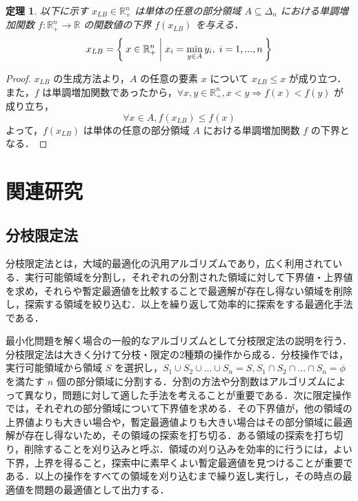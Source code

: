 \documentclass[a4paper,11pt]{jreport}
\newtheorem{theorem}{定理}
\begin{document}
\begin{theorem}\label{lower_bound_of_monotonic_function}
以下に示す $ x_{LB} \in \mathbb{R}^n_{+} $ は単体の任意の部分領域 $ A \subseteq \Delta_n $ における単調増加関数 $ f :  \mathbb{R}^n_{+} \to \mathbb{R} $ の関数値の下界 $ f(x_{LB}) $ を与える．
$$ x_{LB} = \Set{ x \in \mathbb{R}^n_{+} | x_i = \min_{y \in A } y_i, \; i = 1, ..., n } $$
\end{theorem}

\begin{proof}
$ x_{LB} $ の生成方法より，$ A $ の任意の要素 $ x $ について $ x_{LB} \leq x $ が成り立つ．\\
また，$ f $ は単調増加関数であったから，$ \forall x, y \in \mathbb{R}^n_{+}, x < y \Rightarrow f(x) < f(y) $ が成り立ち，
$$ \forall x \in A, f(x_{LB}) \leq f(x) $$
よって，$ f(x_{LB}) $ は単体の任意の部分領域 $ A $ における単調増加関数 $ f $ の下界となる．
\end{proof}

\chapter{関連研究}

\section{分枝限定法}

分枝限定法とは，大域的最適化の汎用アルゴリズムであり，広く利用されている．実行可能領域を分割し，それぞれの分割された領域に対して下界値・上界値を求め，それらや暫定最適値を比較することで最適解が存在し得ない領域を削除し，探索する領域を絞り込む．以上を繰り返して効率的に探索をする最適化手法である．\par
最小化問題を解く場合の一般的なアルゴリズムとして分枝限定法の説明を行う．分枝限定法は大きく分けて分枝・限定の2種類の操作から成る．分枝操作では，実行可能領域から領域 $ S $ を選択し，$ S_1 \cup S_2 \cup ... \cup S_n = S, S_1 \cap S_2 \cap ... \cap S_n = \phi $ を満たす $ n $ 個の部分領域に分割する．分割の方法や分割数はアルゴリズムによって異なり，問題に対して適した手法を考えることが重要である．次に限定操作では，それぞれの部分領域について下界値を求める．その下界値が，他の領域の上界値よりも大きい場合や，暫定最適値よりも大きい場合はその部分領域に最適解が存在し得ないため，その領域の探索を打ち切る．ある領域の探索を打ち切り，削除することを刈り込みと呼ぶ．領域の刈り込みを効率的に行うには，よい下界，上界を得ること，探索中に素早くよい暫定最適値を見つけることが重要である．以上の操作をすべての領域を刈り込むまで繰り返し実行し，その時点の最適値を問題の最適値として出力する．\par
\end{document}
